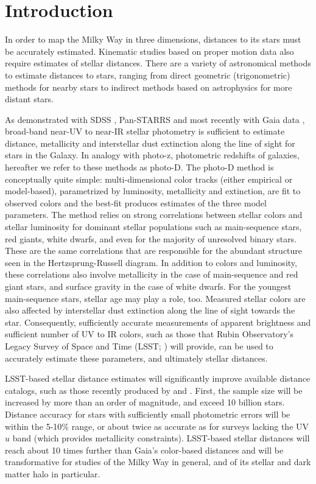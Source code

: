 \section{Introduction} \label{sec:intro}


In order to map the Milky Way in three dimensions, distances to its stars must be accurately  estimated.
Kinematic studies based on proper motion data also require estimates of stellar distances.  There are a variety
of astronomical methods to estimate distances to stars, ranging from direct geometric (trigonometric) methods
for nearby stars to indirect methods based on astrophysics for more distant stars.

As demonstrated with SDSS \citep{2008ApJ...673..864J, 2008ApJ...684..287I}, Pan-STARRS \citep{2014ApJ...783..114G, green_3d_2019} and most recently with
Gaia data \citep{bailer-jones_estimating_2021}, broad-band near-UV to near-IR stellar photometry is sufficient
to estimate distance, metallicity and interstellar dust extinction along the line of sight for stars in the Galaxy.
In analogy with photo-z, photometric redshifts of galaxies, hereafter we refer to these methods as photo-D. 
The photo-D method is conceptually quite simple: multi-dimensional color tracks (either empirical or model-based),
parametrized by luminosity, metallicity and extinction, are fit to observed colors and the best-fit produces estimates
of the three model parameters. The method relies on strong correlations between stellar colors and
stellar luminosity for dominant stellar populations such as main-sequence stars, red giants, white dwarfs, and even
for the majority of unresolved binary stars. These are the same correlations that are responsible for the abundant
structure seen in the Hertzsprung-Russell diagram. In addition to colors and luminosity, these correlations
also involve metallicity in the case of main-sequence and red giant stars, and surface gravity in the case of white dwarfs.
For the youngest main-sequence stars, stellar age may play a role, too. Measured stellar colors are also affected
by interstellar dust extinction along the line of sight towards the star. Consequently, sufficiently accurate measurements of apparent
brightness and sufficient number of UV to IR colors, such as those that Rubin Observatory's Legacy Survey of Space
and Time (LSST; \citealt{2019ApJ...873..111I}) will provide, can be used to accurately estimate these parameters,
and ultimately stellar distances.

LSST-based stellar distance estimates will significantly improve available distance catalogs, such as those recently produced by \cite{green_3d_2019}
and \cite{bailer-jones_estimating_2021}. First, the sample size will be increased by more than an order of magnitude, and exceed 10 billion stars.
Distance accuracy for stars with sufficiently small photometric errors will be within the 5-10\% range, or about twice
as accurate as for surveys lacking the UV $u$ band (which provides metallicity constraints). LSST-based stellar distances
will reach about 10 times further than Gaia’s color-based distances and will be transformative for studies of the
Milky Way in general, and of its stellar and dark matter halo in particular. 

